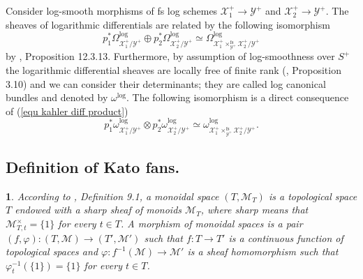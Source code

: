 \documentclass{amsart}%
\numberwithin{equation}{subsection}
\theoremstyle{plain2}
\theoremstyle{definition2}
\theoremstyle{stepstyle}
\theoremstyle{point}
\theoremstyle{subpoint}
\newtheorem{subpoint}[equation]{}%
\newcommand{\spa}[1]{\begin{subpoint}#1\end{subpoint}}           %
\newcommand{\cX}{\ensuremath{\mathscr{X}}}
\newcommand{\caM}{\ensuremath{\mathcal{M}}}
\newcommand{\cY}{\ensuremath{\mathscr{Y}}}
\newcommand{\cZ}{\ensuremath{\mathscr{Z}}}
\renewcommand{\cZ}{\ensuremath{\mathscr{Z}}}
\renewcommand{\cY}{\ensuremath{\mathscr{Y}}}
\begin{document}
{%

Consider log-smooth morphisms of fs log schemes $\cX_1^+ \rightarrow \cY^+$ and $\cX_2^+ \rightarrow \cY^+$. The sheaves of logarithmic differentials are related by the following isomorphism \begin{equation} \label{equ kahler diff product}
p_1^* \Omega^{\log}_{\cX_1^+/\cY^+} \oplus p_2^* \Omega^{\log}_{\cX_2^+/ \cY^+} \simeq \Omega^{\log}_{\cX_1^+\times^{\text{fs}}_{\cY^+} \cX_2^+ /\cY^+}\end{equation} by \cite{GabberRamero}, Proposition 12.3.13. Furthermore, by assumption of log-smoothness over $S^+$ the logarithmic differential sheaves are locally free of finite rank (\cite{Kato1994a}, Proposition 3.10) and we can consider their determinants; they are called log canonical bundles and denoted by $\omega^{\log}$. The following isomorphism is a direct consequence of (\ref{equ kahler diff product}) \begin{equation} \label{equ log can bundles}
p_1^* \omega^{\log}_{\cX_1^+/\cY^+} \otimes p_2^* \omega^{\log}_{\cX_2^+/ \cY^+} \simeq \omega^{\log}_{\cX_1^+\times^{\text{fs}}_{\cY^+} \cX_2^+ /\cY^+}.\end{equation} }


\subsection{Definition of Kato fans.}
\spa{ According to \cite{Kato1994a}, Definition 9.1, a monoidal space $(T, \caM_T)$ is a topological space $T$ endowed with a sharp sheaf of monoids $\caM_T$, where \textit{sharp} means that $\caM_{T,t}^\times = \{1\}$ for every $t \in T$. A morphism of monoidal spaces is a pair $(f,\varphi):(T,\caM) \rightarrow (T',\caM')$  such that $f:T \rightarrow T'$ is a continuous function of topological spaces and $\varphi: f^{-1}(\caM) \rightarrow \caM'$ is a sheaf homomorphism such that $\varphi_{t}^{-1}(\{1\})=\{1\}$ for every $t \in T$.}
\end{document}
